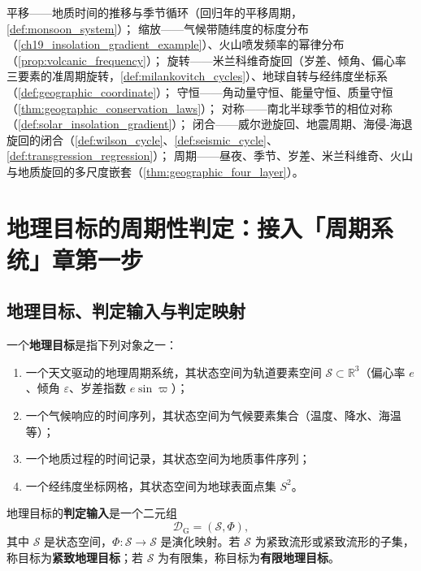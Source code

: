 \begin{remark}[本章七主题导引]\label{rem:geo_seven_themes}
平移——地质时间的推移与季节循环（回归年的平移周期，\cref{def:monsoon_system}）；
缩放——气候带随纬度的标度分布（\cref{ch19_insolation_gradient_example}）、火山喷发频率的幂律分布（\cref{prop:volcanic_frequency}）；
旋转——米兰科维奇旋回（岁差、倾角、偏心率三要素的准周期旋转，\cref{def:milankovitch_cycles}）、地球自转与经纬度坐标系（\cref{def:geographic_coordinate}）；
守恒——角动量守恒、能量守恒、质量守恒（\cref{thm:geographic_conservation_laws}）；
对称——南北半球季节的相位对称（\cref{def:solar_insolation_gradient}）；
闭合——威尔逊旋回、地震周期、海侵-海退旋回的闭合（\cref{def:wilson_cycle}、\cref{def:seismic_cycle}、\cref{def:transgression_regression}）；
周期——昼夜、季节、岁差、米兰科维奇、火山与地质旋回的多尺度嵌套（\cref{thm:geographic_four_layer}）。
\end{remark}

\section{地理目标的周期性判定：接入「周期系统」章第一步}
\label{sec:geo_periodicity_decision}

\subsection{地理目标、判定输入与判定映射}

\begin{definition}[地理目标与判定输入]\label{def:geo_target}
一个\textbf{地理目标}是指下列对象之一：
\begin{enumerate}[label=(\roman*)]
    \item 一个天文驱动的地理周期系统，其状态空间为轨道要素空间 $\mathcal S\subset\mathbb R^3$（偏心率 $e$、倾角 $\varepsilon$、岁差指数 $e\sin\varpi$）；
    \item 一个气候响应的时间序列，其状态空间为气候要素集合（温度、降水、海温等）；
    \item 一个地质过程的时间记录，其状态空间为地质事件序列；
    \item 一个经纬度坐标网格，其状态空间为地球表面点集 $S^2$。
\end{enumerate}
地理目标的\textbf{判定输入}是一个二元组
\[
\mathcal D_{\mathrm{G}}=(\mathcal S,\Phi),
\]
其中 $\mathcal S$ 是状态空间，$\Phi:\mathcal S\to\mathcal S$ 是演化映射。若 $\mathcal S$ 为紧致流形或紧致流形的子集，称目标为\textbf{紧致地理目标}；若 $\mathcal S$ 为有限集，称目标为\textbf{有限地理目标}。
\end{definition}

